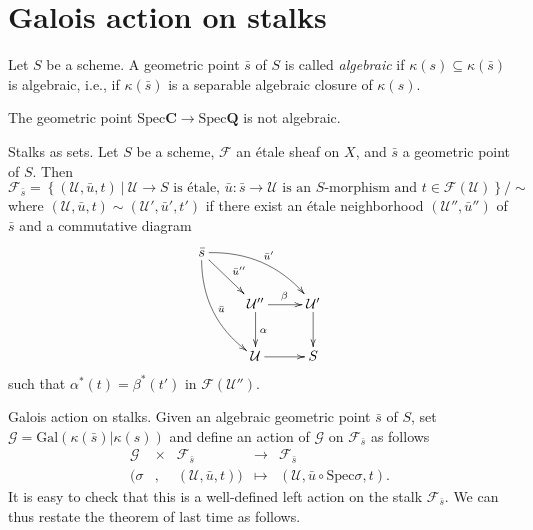 \section{Galois action on stalks}
\label{section-galois-action-stalks}

\begin{definition}
\label{definition-algebraic-geometric-point}
Let $S$ be a scheme. A geometric point $\bar s$ of $S$ is called
{\it algebraic} if $\kappa(s) \subseteq \kappa(\bar s)$ is
algebraic, i.e., if $\kappa(\bar s)$ is a separable algebraic
closure of $\kappa(s)$.
\end{definition}

\begin{example}
\label{example-stupid}
The geometric point $\text{Spec} \mathbf{C} \to \text{Spec} \mathbf{Q}$ is not
algebraic.
\end{example}

\noindent
Stalks as sets. Let $S$ be a scheme, $\mathcal{F}$ an
\'etale sheaf on $X$, and $\bar s$ a geometric point of $S$. Then
$$
\mathcal{F}_{\bar s} = \left\{
(\mathcal{U},\bar u, t) \ \big| \ \mathcal{U} \to S \text{ is \'etale, } \bar u
: \bar s \to \mathcal{U} \text{ is an $S$-morphism and } t \in
\mathcal{F}(\mathcal{U})
\right\}
\big/\sim
$$
where $(\mathcal{U},\bar u, t) \sim (\mathcal{U}',\bar u', t')$ if there exist
an \'etale neighborhood $(\mathcal{U}'',\bar u'')$ of $\bar s$ and a
commutative diagram
$$
\xymatrix{
\bar s \ar^{\bar u''}[rd] \ar^{\bar u'}@/^1pc/[rrd] \ar^{\bar u}@/_1pc/[rdd] \\
& \mathcal{U}'' \ar^{\beta}[r] \ar^{\alpha}[d] & \mathcal{U}' \ar[d] \\
& \mathcal{U} \ar[r] & S
}
$$
such that $\alpha^*(t) = \beta^*(t')$ in $\mathcal{F}(\mathcal{U}'')$.

\medskip\noindent
Galois action on stalks.
Given an algebraic geometric point $\bar s$ of $S$, set $\mathcal{G} =
\text{Gal}(\kappa(\bar s) | \kappa(s))$ and define an action of $\mathcal{G}$
on $\mathcal{F}_{\bar s}$ as follows
$$
\begin{matrix}
\mathcal{G} & \times & \mathcal{F}_{\bar s} & \longrightarrow &
\mathcal{F}_{\bar s} \\
(\sigma & , & (\mathcal{U},\bar u, t)) & \longmapsto & (\mathcal{U},\bar u
\circ \text{Spec} \sigma, t).
\end{matrix}
$$
It is easy to check that this is a well-defined left action on the stalk
$\mathcal{F}_{\bar s}$. We can thus restate the theorem of last time as follows.

